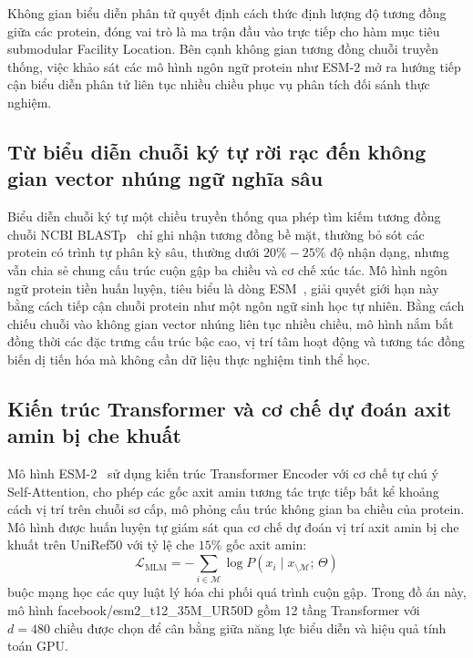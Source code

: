 Không gian biểu diễn phân tử quyết định cách thức định lượng độ tương đồng giữa các protein, đóng vai trò là ma trận đầu vào trực tiếp cho hàm mục tiêu submodular Facility Location. Bên cạnh không gian tương đồng chuỗi truyền thống, việc khảo sát các mô hình ngôn ngữ protein như ESM-2 mở ra hướng tiếp cận biểu diễn phân tử liên tục nhiều chiều phục vụ phân tích đối sánh thực nghiệm.

\subsection{Từ biểu diễn chuỗi ký tự rời rạc đến không gian vector nhúng ngữ nghĩa sâu}
\label{subsec:representation_shift}

Biểu diễn chuỗi ký tự một chiều truyền thống qua phép tìm kiếm tương đồng chuỗi NCBI BLASTp~\cite{blast} chỉ ghi nhận tương đồng bề mặt, thường bỏ sót các protein có trình tự phân kỳ sâu, thường dưới $20\% - 25\%$ độ nhận dạng, nhưng vẫn chia sẻ chung cấu trúc cuộn gập ba chiều và cơ chế xúc tác. Mô hình ngôn ngữ protein tiền huấn luyện, tiêu biểu là dòng ESM~\cite{esm2}, giải quyết giới hạn này bằng cách tiếp cận chuỗi protein như một ngôn ngữ sinh học tự nhiên. Bằng cách chiếu chuỗi vào không gian vector nhúng liên tục nhiều chiều, mô hình nắm bắt đồng thời các đặc trưng cấu trúc bậc cao, vị trí tâm hoạt động và tương tác đồng biến dị tiến hóa mà không cần dữ liệu thực nghiệm tinh thể học.

\subsection{Kiến trúc Transformer và cơ chế dự đoán axit amin bị che khuất}
\label{subsec:transformer_mlm}

Mô hình ESM-2~\cite{esm2} sử dụng kiến trúc Transformer Encoder với cơ chế tự chú ý Self-Attention, cho phép các gốc axit amin tương tác trực tiếp bất kể khoảng cách vị trí trên chuỗi sơ cấp, mô phỏng cấu trúc không gian ba chiều của protein. Mô hình được huấn luyện tự giám sát qua cơ chế dự đoán vị trí axit amin bị che khuất trên UniRef50 với tỷ lệ che $15\%$ gốc axit amin:
\begin{equation}
\label{eq:mlm_loss}
\mathcal{L}_{\text{MLM}} = -\sum_{i \in \mathcal{M}} \log P(x_i \mid x_{\setminus \mathcal{M}}; \, \Theta)
\end{equation}
buộc mạng học các quy luật lý hóa chi phối quá trình cuộn gập. Trong đồ án này, mô hình facebook/esm2\_t12\_35M\_UR50D gồm 12 tầng Transformer với $d = 480$ chiều được chọn để cân bằng giữa năng lực biểu diễn và hiệu quả tính toán GPU.

